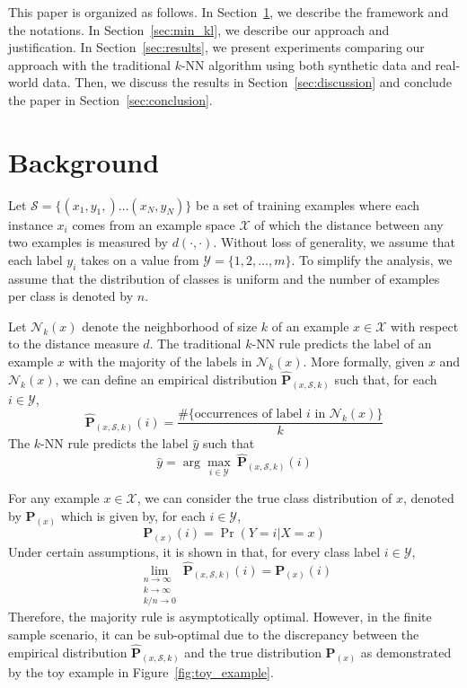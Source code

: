 \documentclass{article}
\begin{document}
This paper is organized as follows. In Section~\ref{sec:background},
we describe the framework and the notations. In
Section~\ref{sec:min_kl}, we describe our approach and
justification. In Section~\ref{sec:results}, we present experiments
comparing our approach with the traditional $k$-NN algorithm using
both synthetic data and real-world data. Then, we discuss the results
in Section~\ref{sec:discussion} and conclude the paper in
Section~\ref{sec:conclusion}.

\section{Background}
\label{sec:background}

\newcommand{\X}{\mathcal{X}}
\newcommand{\Y}{\mathcal{Y}}
\newcommand{\trainset}{\mathcal{S}}

Let $\trainset = \{ (x_1,y_1,) \ldots (x_N,y_N)\}$ be a set of
training examples where each instance $x_i$ comes from an example
space $\X$ of which the distance between any two examples is measured
by $d(\cdot,\cdot)$. Without loss of generality, we assume that each
label $y_i$ takes on a value from $\Y = \{1,2,\ldots,m\}$. To simplify
the analysis, we assume that the distribution of classes is uniform
and the number of examples per class is denoted by $n$.

\newcommand{\nh}{\mathcal{N}}
\newcommand{\Pemp}{\widehat{\mathbf{P}}_{(x,\trainset,k)}}
\newcommand{\Ptrue}{\mathbf{P}_{(x)}}

Let $\nh_k(x)$ denote the neighborhood of size $k$ of an example $x
\in \X$ with respect to the distance measure $d$. The traditional
$k$-NN rule predicts the label of an example $x$ with the majority of
the labels in $\nh_k(x)$. More formally, given $x$ and $\nh_k(x)$, we
can define an empirical distribution $\Pemp$ such that, for each $i \in \Y$, 
\[
\Pemp(i) = \frac{\#\{ \mbox{occurrences of label } i \mbox{ in } \nh_k(x)\}}{k}
\]
The $k$-NN rule predicts the label $\hat{y}$ such that
\[
\hat{y} = \arg\max_{i \in \Y} \: \Pemp(i)
\]

For any example $x \in \X$, we can consider the true class
distribution of $x$, denoted by $\Ptrue$ which is given by, for each $i \in \Y$,
\[
\Ptrue(i) = \Pr(Y=i | X=x)
\]
Under certain assumptions, it is shown in \cite{Fix1951} that,
for every class label $i \in \Y$, 
\[
\lim_{\substack{n \to \infty\\k \to \infty\\k/n \to 0}} \Pemp(i) = \Ptrue(i)
\]
Therefore, the majority rule is asymptotically optimal. However, in
the finite sample scenario, it can be sub-optimal due to the discrepancy
between the empirical distribution $\Pemp$ and the true distribution
$\Ptrue$ as demonstrated by the toy example in
Figure~\ref{fig:toy_example}.
\end{document}
